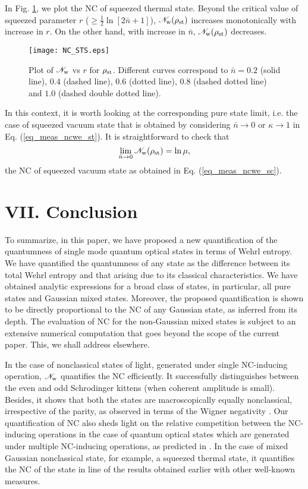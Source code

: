 \documentclass[letter,scriptaddress,twocolumn,prl,showkeys]{revtex4}
\begin{document}
In Fig. \ref{fig_ncwe_sts}, we plot the NC of squeezed thermal state. 
Beyond the critical value of squeezed parameter $r$ ($\geq\frac{1}{2}\ln [2\bar{n}+1]$), $\mathscr{N}_{\rm{w}}(\rho_{\rm{st}})$ increases monotonically with increase in $r$. 
On the other hand, with increase in $\bar{n}$, $\mathscr{N}_{\rm{w}}(\rho_{\rm{st}})$ decreases.
\begin{figure}[h!]
\texttt{[image: NC\_STS.eps]}
\vspace*{-10pt}
\caption{Plot of $\mathscr{N}_{\rm{w}}$ vs $r$ for $\rho_{\rm{st}}$.
Different curves correspond to $\bar{n}=0.2$ (solid line), $0.4$ (dashed line), $0.6$ (dotted line), $0.8$ (dashed dotted line) and $1.0$ (dashed double dotted line).}
\label{fig_ncwe_sts}
\end{figure}

In this context, it is worth looking at the corresponding pure state limit, i.e. the case of squeezed vacuum state that is obtained by considering $\bar{n}\rightarrow 0$ or $\kappa\rightarrow 1$ in Eq. (\ref{eq_meas_ncwe_st}). 
It is straightforward to check that
\begin{equation}
\lim_{\bar{n}\rightarrow 0} \mathscr{N}_{\rm{w}}(\rho_{\rm{st}}) = \ln \mu,
\end{equation}
the NC of squeezed vacuum state as obtained in Eq. (\ref{eq_meas_ncwe_sc}).

\section*{VII. Conclusion}

To summarize, in this paper, we have proposed a new quantification of the quantumness of single mode quantum optical states in terms of Wehrl entropy. 
We have quantified the quantumness of any state as the difference between its total Wehrl entropy and that arising due to its classical characteristics. 
We have obtained analytic expressions for a broad class of states, in particular, all pure states and Gaussian mixed states. 
Moreover, the proposed quantification is shown to be directly proportional to the NC of any Gaussian state, as inferred from its depth. 
The evaluation of NC for the non-Gaussian mixed states is subject to an extensive numerical computation that goes beyond the scope of the current paper. 
This, we shall address elsewhere.

In the case of nonclassical states of light, generated under single NC-inducing operation, $\mathscr{N}_{\rm{w}}$ quantifies the NC efficiently. 
It successfully distinguishes between the even and odd Schrodinger kittens (when coherent amplitude is small).
Besides, it shows that both the states are macroscopically equally nonclassical, irrespective of the parity, as observed in terms of the Wigner negativity \cite{ncm_nwf_kenfack}. 
Our quantification of NC also sheds light on the relative competition between the NC-inducing operations in the case of quantum optical states which are generated under multiple NC-inducing operations, as predicted in \cite{nc_bsent_bose_kumar}. 
In the case of mixed Gaussian nonclassical state, for example, a squeezed thermal state, it quantifies the NC of the state in line of the results obtained earlier with other well-known measures.
\end{document}
